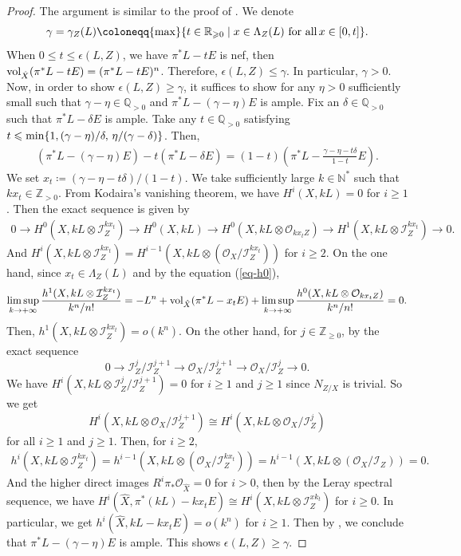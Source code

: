 \documentclass[12pt]{amsart}
\theoremstyle{definition}
\def\min{{\rm min}}
\def\max{{\rm max}}
\def\limsup{{\rm lim\,sup}}
\def\vol{{\rm vol}}
\newcommand{\IN}{{\mathbb N}}
\newcommand{\IQ}{{\mathbb Q}}
\newcommand{\IR}{{\mathbb R}}
\newcommand{\IZ}{{\mathbb Z}}
\newcommand{\CI}{{\mathcal I}}
\newcommand{\CO}{{\mathcal O}}
\newcommand{\lee}{\leqslant}
\newcommand{\gee}{\geqslant}
\begin{document}
\begin{proof}
   The argument is similar to the proof of \cite[Theorem 2.3(2)]{Fuj18}. We denote 
   \begin{equation}\label{eq-gamZ}
   \gamma=\gamma_Z(L)\coloneqq \max\{t\in \IR_{\gee 0}\mid x\in \Lambda_Z(L) \,\, \text{for all}\, x\in[0,t]\}.
   \end{equation}
   When $0\lee t \lee \epsilon(L,Z)$, we have $\pi^*L-tE$ is nef, then $\vol_{\hat{X}}(\pi^*L-tE)=(\pi^*L-tE)^n$. Therefore, $\epsilon(L,Z)\lee \gamma$. In particular, $\gamma>0$. Now, in order to show $\epsilon(L,Z)\gee \gamma$, it suffices to show for any $\eta>0$ sufficiently small such that $\gamma-\eta\in \IQ_{>0}$ and $\pi^*L-(\gamma-\eta)E$ is ample. Fix an $\delta\in \IQ_{>0}$ such that $\pi^*L-\delta E$ is ample. Take any $t\in \IQ_{>0}$ satisfying $t\lee \min\{1,(\gamma-\eta)/\delta,\,\eta/(\gamma-\delta)\}$. Then,
    \begin{eqnarray*}
        \left(\pi^*L-(\gamma -\eta)E\right) - t(\pi^*L-\delta E) = (1-t) \left(\pi^*L-\frac{\gamma-\eta-t\delta}{1-t}E\right).
    \end{eqnarray*}
    We set $x_t\coloneqq (\gamma-\eta -t\delta)/(1-t)$. We take sufficiently large $k\in \IN^*$ such that $kx_t\in \IZ_{>0}$. From Kodaira's vanishing theorem, we have $H^i(X,kL)=0$ for $i\gee 1$. Then the exact sequence is given by
\begin{eqnarray*}
    0\rightarrow H^0(X,kL\otimes\CI_Z^{kx_t})\rightarrow  H^0(X,kL)\rightarrow H^0(X,kL\otimes \CO_{kx_tZ}) \rightarrow H^1(X,kL\otimes\CI_Z^{kx_t})\rightarrow 0.
\end{eqnarray*}
And $H^i(X,kL\otimes \CI_{Z}^{kx_t})=H^{i-1}(X,kL\otimes (\CO_X/\CI_Z^{kx_t}))$ for $i\gee 2$. On the one hand, since $x_t\in \Lambda_Z(L)$ and by the equation (\ref{eq-h0}),
\begin{eqnarray*}
    \mathop{\limsup}_{k\rightarrow+\infty}\frac{h^1(X,kL\otimes\CI_{Z}^{kx_t})}{k^n/n!} = -L^n+\vol_{\hat{X}}(\pi^*L-x_tE)+\mathop{\limsup}_{k\rightarrow+\infty}\frac{h^0(X,kL\otimes \CO_{kx_tZ})}{k^n/n!}=0.
\end{eqnarray*}
Then, $h^1(X,kL\otimes\CI_{Z}^{kx_t})=o(k^n)$. On the other hand, for  $j\in \IZ_{\gee 0}$, by the exact sequence
$$
0\rightarrow \CI_Z^{j}/\CI_Z^{j+1}\rightarrow \CO_X/\CI_Z^{j+1}\rightarrow \CO_X/\CI_Z^{j} \rightarrow 0.
$$
We have $H^i(X,kL\otimes \CI_Z^{j}/\CI_Z^{j+1}) = 0$ for $i\gee 1$ and $j\gee 1$ since $N_{Z/X}$ is trivial. So we get 
$$
H^i(X,kL\otimes \CO_X/\CI_Z^{j+1})\cong H^i(X,kL\otimes \CO_X/\CI_Z^{j})
$$ 
for all $i\gee 1$ and $j\gee 1$. Then, for $i\gee 2$,
\begin{eqnarray*}
    h^i(X,kL\otimes \CI_{Z}^{kx_t})=h^{i-1}(X,kL\otimes (\CO_X/\CI_Z^{kx_t}))= h^{i-1}(X,kL\otimes (\CO_X/\CI_Z))=0.
\end{eqnarray*}
And the higher direct images $R^i\pi_*\CO_{\hat{X}}=0$ for $i>0$, then by the Leray spectral sequence, we have $H^i(\hat{X},\pi^*(kL)-kx_tE) \cong H^i(X,kL\otimes \CI_Z^{xk_t})$ for $i\gee 0$. In particular, we get $h^i(\hat{X}, kL-kx_tE)=o(k^n)$ for $i\gee 1$. Then by \cite[Theorem A]{dFKL07}, we conclude that $\pi^*L-(\gamma-\eta)E$ is ample. This shows $\epsilon(L,Z)\gee \gamma$.
\end{proof}
\end{document}
